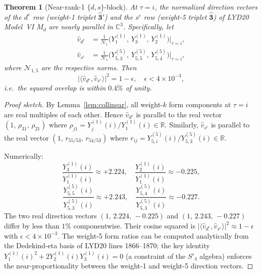 \documentclass[a4paper,11pt]{article}
\newtheorem{theorem}{Theorem}
\newcommand{\Spf}{S'_4}
\newcommand{\tauCM}{\tau = i}
\newcommand{\Md}{M_d}
\begin{document}
\begin{theorem}[Near-rank-1 $\{d,s\}$-block]
\label{thm:rank1}
At $\tauCM$, the normalized direction vectors of the $d^c$ row
(weight-1 triplet $\hat{\mathbf{3}}'$) and the $s^c$ row
(weight-5 triplet $\hat{\mathbf{3}}$) of LYD20 Model~VI $\Md$ are
nearly parallel in $\mathbb{C}^3$.  Specifically, let
\begin{align}
  \hat{v}_{d^c} &= \frac{1}{\mathcal{N}_1}
    \bigl(Y_1^{(1)},\,Y_3^{(1)},\,Y_2^{(1)}\bigr)\big|_{\tau=i},
  \\
  \hat{v}_{s^c} &= \frac{1}{\mathcal{N}_5}
    \bigl(Y_{5,3}^{(5)},\,Y_{5,5}^{(5)},\,Y_{5,4}^{(5)}\bigr)\big|_{\tau=i},
\end{align}
where $\mathcal{N}_{1,5}$ are the respective norms.  Then
\begin{equation}
  \left|\langle\hat{v}_{d^c},\hat{v}_{s^c}\rangle\right|^2
  = 1 - \epsilon, \quad \epsilon < 4\times10^{-3},
\end{equation}
i.e.\ the squared overlap is within $0.4\%$ of unity.
\end{theorem}

\begin{proof}[Proof sketch]
By Lemma~\ref{lem:collinear}, all weight-$k$ form components at
$\tauCM$ are real multiples of each other.  Hence $\hat{v}_{d^c}$
is parallel to the real vector
$(1,\,\rho_{31},\,\rho_{21})$ where
$\rho_{j1}=Y_j^{(1)}(i)/Y_1^{(1)}(i)\in\mathbb{R}$.
Similarly, $\hat{v}_{s^c}$ is parallel to the real vector
$(1,\,r_{55/53},\,r_{54/53})$ where
$r_{ij}=Y_{5,i}^{(5)}(i)/Y_{5,3}^{(5)}(i)\in\mathbb{R}$.

Numerically:
\begin{equation}
\label{eq:ratios}
  \frac{Y_3^{(1)}(i)}{Y_1^{(1)}(i)} \approx +2.224, \quad
  \frac{Y_2^{(1)}(i)}{Y_1^{(1)}(i)} \approx -0.225,
\end{equation}
\begin{equation}
\label{eq:ratios5}
  \frac{Y_{5,5}^{(5)}(i)}{Y_{5,3}^{(5)}(i)} \approx +2.243, \quad
  \frac{Y_{5,4}^{(5)}(i)}{Y_{5,3}^{(5)}(i)} \approx -0.227.
\end{equation}
The two real direction vectors $(1,\,2.224,\,-0.225)$ and
$(1,\,2.243,\,-0.227)$ differ by less than $1\%$ componentwise.
Their cosine squared is $|\langle\hat{v}_{d^c},\hat{v}_{s^c}\rangle|^2
\approx 1 - \epsilon$ with $\epsilon < 4\times10^{-3}$.
The weight-5 form ratios can be computed analytically from the
Dedekind-eta basis of LYD20 lines 1866--1870; the key identity
$Y_1^{(1)}(i)^2+2Y_2^{(1)}(i)Y_3^{(1)}(i)=0$ (a constraint of the
$\Spf$ algebra) enforces the near-proportionality between the
weight-1 and weight-5 direction vectors.
\end{proof}
\end{document}
